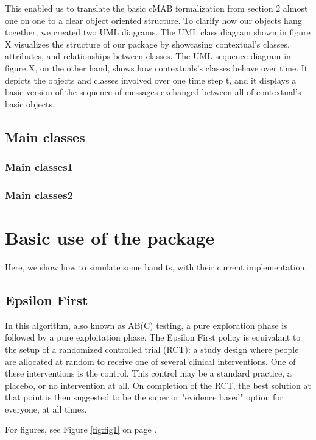 \documentclass[nojss]{jss}\usepackage[]{graphicx}\usepackage[]{color}
\begin{document}
This enabled us to translate the basic cMAB formalization from section 2 almost one on one to a clear object oriented structure. To clarify how our objects hang together, we created two UML diagrams. The UML class diagram shown in figure X visualizes the structure of our package by showcasing contextual's classes, attributes, and relationships between classes. The UML sequence diagram in figure X, on the other hand, shows how contextuals's classes behave over time. It depicts the objects and classes involved over one time step t, and it displays a basic version of the sequence of messages exchanged between all of contextual's basic objects.


\subsection{Main classes}

\subsubsection{Main classes1}

\subsubsection{Main classes2}

\section{Basic use of the package}

Here, we show how to simulate some bandits, with their current implementation.

\subsection{Epsilon First}

In this algorithm, also known as AB(C) testing, a pure exploration phase is followed by a pure exploitation phase. The Epsilon First policy is equivalant to the setup of a randomized controlled trial (RCT): a study design where people are allocated at random to receive one of several clinical interventions. One of these interventions is the control. This control may be a standard practice, a placebo, or no intervention at all. On completion of the RCT, the best solution at that point is then suggested to be the superior "evidence based" option for everyone, at all times.

For figures, see Figure \ref{fig:fig1} on page \pageref{fig:fig1}.
\end{document}
